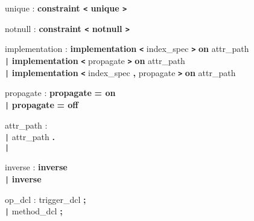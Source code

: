 \begin{tabbing}
\grindent
unique \> : {\bf constraint \texttt{<} unique \texttt{>}}
\end{tabbing}

\begin{tabbing}
\grindent
notnull \> : {\bf constraint \texttt{<} notnull \texttt{>}}
\end{tabbing}

\begin{tabbing}
\grindent
implementation \> : {\bf implementation} {\bf \texttt{<}} index\_spec {\bf \texttt{>}} {\bf on} attr\_path\\
\>\texttt{|} {\bf implementation} {\bf \texttt{<}} propagate {\bf \texttt{>}} {\bf on} attr\_path\\
\>\texttt{|} {\bf implementation} {\bf \texttt{<}} index\_spec {\bf, }propagate {\bf \texttt{>}} {\bf on} attr\_path
\end{tabbing}

\begin{tabbing}
\grindent
propagate \> : {\bf propagate} {\bf = on}\\
\>\texttt{|} {\bf propagate} {\bf = off}
\end{tabbing}

\begin{tabbing}
\grindent
attr\_path \> : \ident\\
\> \texttt{|} attr\_path {\bf .} \ident\\
\> \texttt{|} \ident {\bf ::} \ident
\end{tabbing}

\begin{tabbing}
\grindent
inverse \> : {\bf inverse} \ident {\bf ::} \ident\\
\> \texttt{|} {\bf inverse} \ident
\end{tabbing}

\begin{tabbing}
\grindent
op\_dcl \> : trigger\_dcl {\bf ;}\\
\> \texttt{|} method\_dcl {\bf ;}
\end{tabbing}

